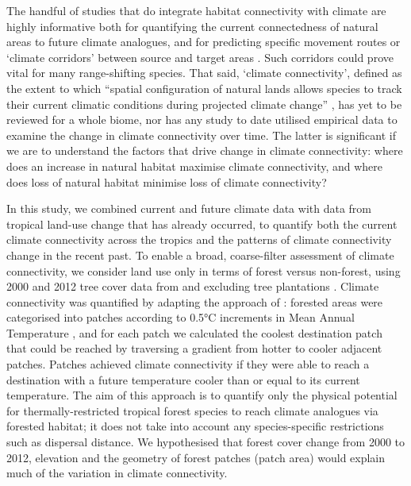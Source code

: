 \documentclass[12pt,a4paper,]{report}
\theoremstyle{definition}
\theoremstyle{definition}
\theoremstyle{definition}
\theoremstyle{remark}
\begin{document}
The handful of studies that do integrate habitat connectivity with
climate are highly informative both for quantifying the current
connectedness of natural areas to future climate analogues, and for
predicting specific movement routes or `climate corridors' between
source and target areas
\citep{mcguire_achieving_2016, littlefield_connecting_2017, nunez_connectivity_2013}.
Such corridors could prove vital for many range-shifting species. That
said, `climate connectivity', defined as the extent to which ``spatial
configuration of natural lands allows species to track their current
climatic conditions during projected climate change''
\citep{mcguire_achieving_2016}, has yet to be reviewed for a whole
biome, nor has any study to date utilised empirical data to examine the
change in climate connectivity over time. The latter is significant if
we are to understand the factors that drive change in climate
connectivity: where does an increase in natural habitat maximise climate
connectivity, and where does loss of natural habitat minimise loss of
climate connectivity?

In this study, we combined current and future climate data with data
from tropical land-use change that has already occurred, to quantify
both the current climate connectivity across the tropics and the
patterns of climate connectivity change in the recent past. To enable a
broad, coarse-filter assessment of climate connectivity, we consider
land use only in terms of forest versus non-forest, using 2000 and 2012
tree cover data from \citet{hansen_high-resolution_2013} and excluding
tree plantations \citep{transparent_world_tree_2015}. Climate
connectivity was quantified by adapting the approach of
\citet{mcguire_achieving_2016}: forested areas were categorised into
patches according to 0.5°C increments in Mean Annual Temperature
\citep{hijmans_very_2005}, and for each patch we calculated the coolest
destination patch that could be reached by traversing a gradient from
hotter to cooler adjacent patches. Patches achieved climate connectivity
if they were able to reach a destination with a future temperature
cooler than or equal to its current temperature. The aim of this
approach is to quantify only the physical potential for
thermally-restricted tropical forest species to reach climate analogues
via forested habitat; it does not take into account any species-specific
restrictions such as dispersal distance. We hypothesised that forest
cover change from 2000 to 2012, elevation and the geometry of forest
patches (patch area) would explain much of the variation in climate
connectivity.
\end{document}

